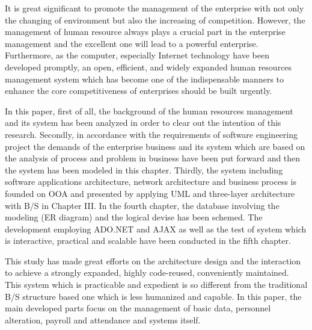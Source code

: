 \begin{enabstract}
It is great significant to promote the management of the enterprise with not only the\linebreak
changing of environment but also the increasing of competition. However, the management of\linebreak
human resource always plays a crucial part in the enterprise management and the excellent one\linebreak
will lead to a powerful enterprise. Furthermore, as the computer, especially Internet technology\linebreak
have been developed promptly, an open, efficient, and widely expanded human resources\linebreak
management system which has become one of the indispensable manners to enhance the core\linebreak
competitiveness of enterprises should be built urgently.

In this paper, first of all, the background of the human resources management and its system\linebreak
has been analyzed in order to clear out the intention of this research. Secondly, in accordance\linebreak
with the requirements of software engineering project the demands of the enterprise business and\linebreak
its system which are based on the analysis of process and problem in business have been put\linebreak
forward and then the system has been modeled in this chapter. Thirdly, the system including\linebreak
software applications architecture, network architecture and business process is founded on OOA\linebreak
and presented by applying UML and three-layer architecture with B/S in Chapter III. In the\linebreak
fourth chapter, the database involving the modeling (ER diagram) and the logical devise has\linebreak
been schemed. The development employing ADO.NET and AJAX as well as the test of system\linebreak
which is interactive, practical and scalable have been conducted in the fifth chapter.

This study has made great efforts on the architecture design and the interaction to achieve a\linebreak
strongly expanded, highly code-reused, conveniently maintained. This system which is\linebreak
practicable and expedient is so different from the traditional B/S structure based one which is\linebreak
less humanized and capable. In this paper, the main developed parts focus on the management of\linebreak
basic data, personnel alteration, payroll and attendance and systems itself.

\end{enabstract}
